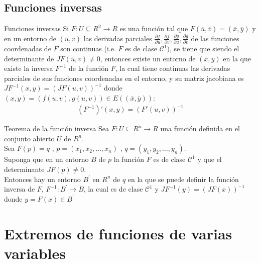 \documentclass[a4paper, twoside]{article}
\numberwithin{equation}{section}
\numberwithin{figure}{section}
\numberwithin{table}{section}
\begin{document}
\subsection{Funciones inversas}
\begin{definicion*}{Funciones inversas}
	Si $F:U\subseteq R^2 \to R$ es una función tal que $F(\overline{u},\overline{v})=(\overline{x},\overline{y})$ y en un entorno de $(\overline{u},\overline{v})$ las derivadas parciales $\frac{\partial f}{\partial u},\frac{\partial f}{\partial v},\frac{\partial g}{\partial u},\frac{\partial g}{\partial v}$ de las funciones coordenadas de $F$ son continuas (i.e. $F$ es de clase $\mathcal{C}^{1})$, se tiene que siendo el determinante de $JF(\overline{u},\overline{v})\ne0$, entonces existe un entorno de $(\overline{x},\overline{y})$ en la que existe la inversa $F^{-1}$ de la función $F$, la cual tiene continuas las derivadas parciales de sus funciones coordenadas en el entorno, y su matriz jacobiana es $JF^{-1}(x,y)=\left(JF(u,v)\right)^{-1}$ donde $(x,y)=(f(u,v),g(u,v)) \in E((\overline{x},\overline{y}))$:
	\begin{align}
		(F^{-1})'(x,y)=\left(F'(u,v)\right)^{-1}
	\end{align}
\end{definicion*}

\begin{teorema*}{Teorema de la función inversa}
	Sea $F:U\subseteq R^n \to R$ una función definida en el conjunto abierto $U$ de $R^n$.\\
	
	Sea $F(p)=q \text{ , } p=(x_1,x_2,\ldots,x_n) \text{ , } q=(y_1,y_2,\ldots,y_n)$.\\
	
	Suponga que en un entorno $B$ de $p$ la función $F$ es de clase $\mathcal{C}^{1}$ y que el determinante $JF(p)\ne0$.\\
	
	Entonces hay un entorno $B^\prime$ en $R^n$ de $q$ en la que se puede definir la función inversa de $F$, $F^{-1}:B^\prime \to B$, la cual es de clase $\mathcal{C}^{1}$ y $JF^{-1}(y)=\left(JF(x)\right)^{-1}$ donde $y=F(x)\in B^\prime$
\end{teorema*}

\newpage
\section{Extremos de funciones de varias variables}
\end{document}
